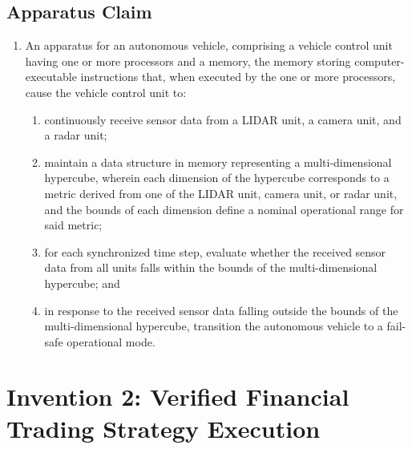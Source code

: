 \documentclass{article}
\begin{document}
\subsection{Apparatus Claim}
\begin{enumerate}[label=1.]
    \item An apparatus for an autonomous vehicle, comprising a vehicle control unit having one or more processors and a memory, the memory storing computer-executable instructions that, when executed by the one or more processors, cause the vehicle control unit to:
    \begin{enumerate}[label=(\alph*)]
        \item continuously receive sensor data from a LIDAR unit, a camera unit, and a radar unit;
        \item maintain a data structure in memory representing a multi-dimensional hypercube, wherein each dimension of the hypercube corresponds to a metric derived from one of the LIDAR unit, camera unit, or radar unit, and the bounds of each dimension define a nominal operational range for said metric;
        \item for each synchronized time step, evaluate whether the received sensor data from all units falls within the bounds of the multi-dimensional hypercube; and
        \item in response to the received sensor data falling outside the bounds of the multi-dimensional hypercube, transition the autonomous vehicle to a fail-safe operational mode.
    \end{enumerate}
\end{enumerate}

\newpage

\section{Invention 2: Verified Financial Trading Strategy Execution}
\end{document}

